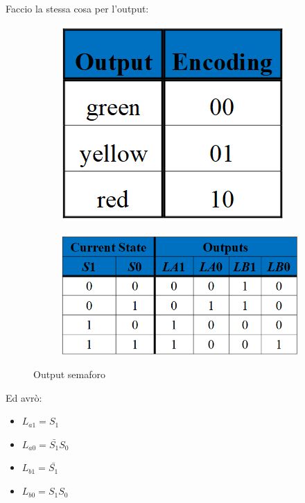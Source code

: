 \documentclass{article}
\begin{document}
\vspace{5pt}

Faccio la stessa cosa per l'output:

    \begin{figure}[ht]
    \begin{minipage}[t]{0.49\textwidth}
        \centering
        \begin{figure}[H]
        \centering
        \includegraphics[width=.55\linewidth]{semaforo_cod_out.png}
        \end{figure}
        \label{fig:semaforo_cod_out}
    \end{minipage}
    \begin{minipage}[t]{0.49\textwidth}
    \centering
    \begin{figure}[H]
    \centering
    \includegraphics[width=\linewidth]{semaforo_out.png}
    \end{figure}
    \label{fig:semaforo_out}
    \end{minipage}
    \caption{Output semaforo}
    \end{figure}

Ed avrò:
\begin{itemize}
    \item $L_{a1} = S_1$
    \item $L_{a0} = \bar{S_1}S_0$
    \item $L_{b1} = \bar{S_1}$
    \item $L_{b0} = S_1S_0$
\end{itemize}
\end{document}
